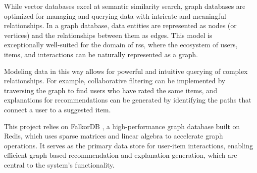 While vector databases excel at semantic similarity search, graph databases are optimized for managing and querying data with intricate and meaningful relationships. In a graph database, data entities are represented as nodes (or vertices) and the relationships between them as edges. This model is exceptionally well-suited for the domain of \acl{rs}s, where the ecosystem of users, items, and interactions can be naturally represented as a graph.

Modeling data in this way allows for powerful and intuitive querying of complex relationships. For example, collaborative filtering can be implemented by traversing the graph to find users who have rated the same items, and explanations for recommendations can be generated by identifying the paths that connect a user to a suggested item.

This project relies on FalkorDB \cite{FALKORDB}, a high-performance graph database built on Redis, which uses sparse matrices and linear algebra to accelerate graph operations. It serves as the primary data store for user-item interactions, enabling efficient graph-based recommendation and explanation generation, which are central to the system's functionality.

